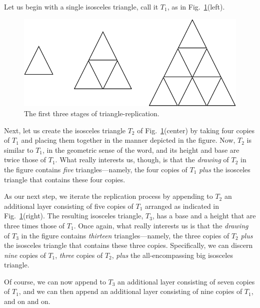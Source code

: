 \begin{enumerate}
Let us begin with a single isosceles triangle, call it $T_1$, as in Fig.~\ref{fig:countingTriangles}(left).
\begin{figure}[h]
\begin{center}
        \includegraphics[scale=0.35]{FiguresArithmetic/CountingTriangles}
        \caption{The first three stages of triangle-replication.}
        \label{fig:countingTriangles}
\end{center}
\end{figure}

Next, let us create the isosceles triangle $T_2$ of Fig.~\ref{fig:countingTriangles}(center) by taking four copies of $T_1$ and placing them together in the manner depicted in the figure. 
Now, $T_2$ is similar to $T_1$, in the geometric sense of the word, and its height and base are twice those of $T_1$.  What really interests us, though, is that the {\em drawing} of $T_2$ in the figure contains {\em five} triangles---namely, the four copies of $T_1$ {\em plus} the isosceles triangle that contains these four copies.

\smallskip

As our next step, we iterate the replication process by appending to $T_2$ an additional layer consisting of five copies of $T_1$ arranged as indicated in Fig.~\ref{fig:countingTriangles}(right).  
The resulting isosceles triangle, $T_3$, has a base and a height that are three times those of $T_1$.  Once again, what really interests us is that the {\em drawing} of $T_3$ in the figure contains {\em thirteen} triangles---namely, the three copies of $T_2$ {\em plus} the isosceles triangle that contains these three copies.  Specifically, we can discern {\em nine} copies of $T_1$,  {\em three} copies of $T_2$, {\em plus} the all-encompassing big isosceles triangle.

\smallskip

Of course, we can now append to $T_3$ an additional layer consisting of seven copies of $T_1$, and we can then append an additional layer consisting of nine copies of $T_1$, and on and on.
\smallskip


\end{enumerate}
